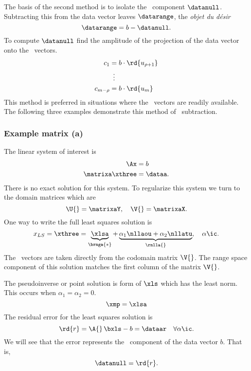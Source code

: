 The basis of the second method is to isolate the \ns\ component $\datanull$. Subtracting this from the data vector leaves $\datarange$, the \emph{objet du d\'esir}
\begin{equation}
  \datarange = b - \datanull.
\end{equation}
To compute $\datanull$ find the amplitude of the projection of the data vector onto the \ns\ vectors.
\begin{equation}
  \begin{split}
    c_{1} &= b \cdot {\rd{ u_{\rho+1} }} \\
          &\ \, \vdots \\
    c_{m-\rho} &= b \cdot {\rd{ u_{m} }}
  \end{split}
\end{equation}
This method is preferred in situations where the \ns \ vectors are readily available. The following three examples demonstrate this method of \ns\ subtraction.

\subsubsection{Example matrix (a)}
The linear system of interest is
%
\begin{equation}
  \begin{split}
    \Ax &= b \\
    \matrixa \xthree &= \dataa.
  \end{split}
  \label{eq:ls:a}
\end{equation}
%
There is no exact solution for this system. To regularize this system we turn to the domain matrices which are
\begin{equation}
  \U{} = \matrixaY, \quad \V{} = \matrixaX .
\end{equation}
%
One way to write the full least squares solution is
%
\begin{equation}
  x_{LS} = \xthree = \underbrace{\xlsa}_{\brnga{*}} + \underbrace{\alpha_{1} \nllaou  + \alpha_{2} \nllatu}_{\rnlla{}}, \quad \alpha\ic.
\end{equation}
%
The \ns\ vectors are taken directly from the codomain matrix $\V{}$. The range space component of this solution matches the first column of the matrix $\V{}$.  

The pseudoinverse or point solution is form of $\xls$ which has the least norm. This occurs when $\alpha_{1} = \alpha_{2} = 0$.
%
\begin{equation}
  \xmp = \xlsa
  \label{eq:solnmp:a}
\end{equation}
%
The residual error for the least squares solution is
%
\begin{equation}
  {\rd{ r }} = \A{}\,\bxls - b = \dataar \quad \forall \alpha\ic.
\end{equation}
%
We will see that the error represents the \ns\ component of the data vector $b$. That is,
%
\begin{equation}
  \datanull = {\rd{ r }}.
\end{equation}

